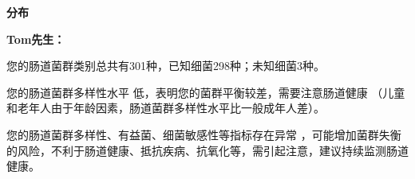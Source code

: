 

\usepackage{graphicx}
\graphicspath{{cores/}}



\setlength{\arrayrulewidth}{0.5pt}
\fontsize{9.3pt}{17pt}\selectfont
\color{gray2}

\vspace*{2mm}
\begin{center}
{\bf\sanhao 分布}
\end{center}

\medskip

\noindent
{\bf\xiaosihao Tom先生：}


\bigskip

您的肠道菌群类别总共有301种，已知细菌298种；未知细菌3种。

您的肠道菌群多样性水平
低，表明您的菌群平衡较差，需要注意肠道健康
（儿童和老年人由于年龄因素，肠道菌群多样性水平比一般成年人差）。

您的肠道菌群多样性、有益菌、细菌敏感性等指标存在异常
，可能增加菌群失衡的风险，不利于肠道健康、抵抗疾病、抗氧化等，需引起注意，建议持续监测肠道健康。

